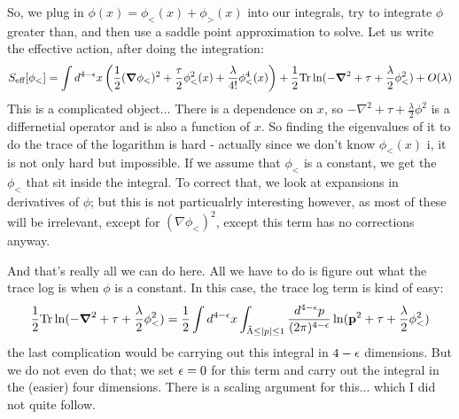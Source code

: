 So, we plug in $\phi(x) = \phi_<(x) + \phi_>(x)$ into our integrals, try to integrate $\phi$ greater than, and then use a saddle point approximation to solve. Let us write the effective action, after doing the integration:
\begin{equation}
    S_{\text{eff}}[\phi_<] = \int d^{4-\e}x\left(\frac{1}{2}(\nabla \phi_<)^2 + \frac{\tau}{2}\phi_<^2(x) + \frac{\lambda}{4!}\phi^4_<(x)\right) + \frac{1}{2}\Tr\ln(-\nabla^2 + \tau + \frac{\lambda}{2}\phi_<^2) + O(\lambda)
\end{equation}
This is a complicated object... There is a dependence on $x$, so $-\nabla^2 + \tau + \frac{\lambda}{2}\phi^2$ is a differnetial operator and is also a function of $x$. So finding the eigenvalues of it to do the trace of the logarithm is hard - actually since we don't know $\phi_<(x)$ i, it is not only hard but impossible. If we assume that $\phi_<$ is a constant, we get the $\phi_<$ that sit inside the integral. To correct that, we look at expansions in derivatives of $\phi$; but this is not particualrly interesting however, as most of these will be irrelevant, except for $(\nabla \phi_<)^2$, except this term has no corrections anyway.

And that's really all we can do here. All we have to do is figure out what the trace log is when $\phi$ is a constant. In this case, the trace log term is kind of easy:
\begin{equation}
    \frac{1}{2}\Tr\ln(-\nabla^2 + \tau + \frac{\lambda}{2}\phi_<^2) = \frac{1}{2}\int d^{4-\e}x \int_{\tilde{\Lambda} \leq \abs{p} \leq 1} \frac{d^{4-\e}p}{(2\pi)^{4-\e}} \ln(\v{p}^2 + \tau + \frac{\lambda}{2}\phi_<^2)
\end{equation}
the last complication would be carrying out this integral in $4 - \epsilon$ dimensions. But we do not even do that; we set $\epsilon = 0$ for this term and carry out the integral in the (easier) four dimensions. There is a scaling argument for this... which I did not quite follow. 

